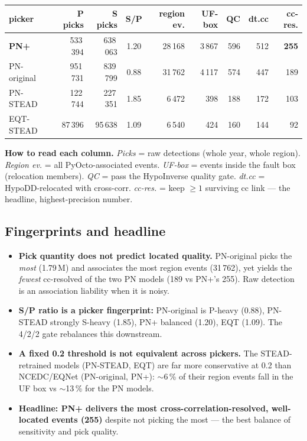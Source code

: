 \documentclass[11pt]{article}
\begin{document}
\begin{center}
\small
\begin{tabular}{@{}lrrcrrrrr@{}}
\toprule
picker & P picks & S picks & S/P & region ev. & UF-box & QC & dt.cc & \textbf{cc-res.} \\
\midrule
\textbf{PN+}          & 533\,394 & 638\,063 & 1.20 & 28\,168 & 3\,867 & 596 & 512 & \textbf{255} \\
PN-original           & 951\,731 & 839\,799 & 0.88 & 31\,762 & 4\,117 & 574 & 447 & 189 \\
PN-STEAD              & 122\,744 & 227\,351 & 1.85 &  6\,472 &   398 & 188 & 172 & 103 \\
EQT-STEAD             &  87\,396 &  95\,638 & 1.09 &  6\,540 &   424 & 160 & 144 &  92 \\
\bottomrule
\end{tabular}
\end{center}

\noindent\textbf{How to read each column.} \emph{Picks} = raw detections (whole year, whole region).
\emph{Region ev.} = all PyOcto-associated events. \emph{UF-box} = events inside the fault box (relocation
members). \emph{QC} = pass the HypoInverse quality gate. \emph{dt.cc} = HypoDD-relocated with cross-corr.
\emph{cc-res.} = keep $\ge 1$ surviving cc link --- the headline, highest-precision number.

\subsection{Fingerprints and headline}

\begin{itemize}[leftmargin=6mm,itemsep=1mm]
\item \textbf{Pick quantity does not predict located quality.} PN-original picks the \emph{most}
(1.79\,M) and associates the most region events (31\,762), yet yields the \emph{fewest} cc-resolved of
the two PN models (189 vs PN+'s 255). Raw detection is an association liability when it is noisy.
\item \textbf{S/P ratio is a picker fingerprint:} PN-original is P-heavy (0.88), PN-STEAD strongly
S-heavy (1.85), PN+ balanced (1.20), EQT (1.09). The 4/2/2 gate rebalances this downstream.
\item \textbf{A fixed 0.2 threshold is not equivalent across pickers.} The STEAD-retrained models
(PN-STEAD, EQT) are far more conservative at 0.2 than NCEDC/EQNet (PN-original, PN+): $\sim$6\,\% of their
region events fall in the UF box vs $\sim$13\,\% for the PN models.
\item \textbf{Headline: PN+ delivers the most cross-correlation-resolved, well-located events (255)}
despite not picking the most --- the best balance of sensitivity and pick quality.
\end{itemize}
\end{document}
